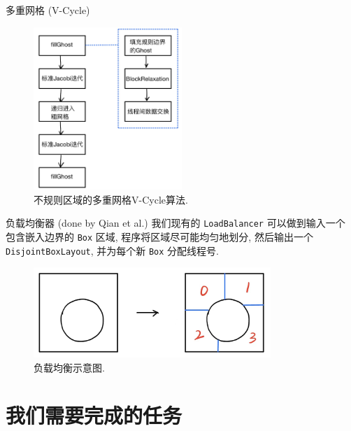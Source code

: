 \documentclass[10pt]{beamer}
\begin{document}
\begin{frame}[fragile]{多重网格 (V-Cycle)}
    \footnotesize
    \begin{figure}[H]
        \centering
        \includegraphics[width=0.5\textwidth]{jpg/v-cycle.jpeg}
        \caption{\footnotesize 不规则区域的多重网格V-Cycle算法.}
    \end{figure}
\end{frame}

\begin{frame}[fragile]{负载均衡器 (done by Qian et al.)}
    \footnotesize
    我们现有的 \verb|LoadBalancer| 可以做到输入一个
    包含嵌入边界的 \verb|Box| 区域,
    程序将区域尽可能均匀地划分,
    然后输出一个 \verb|DisjointBoxLayout|, 
    并为每个新 \verb|Box| 分配线程号.

    \begin{figure}[H]
        \centering
        \includegraphics[width=0.8\textwidth]{jpg/oldbalance.jpeg}
        \caption{\footnotesize 负载均衡示意图.}
    \end{figure}
\end{frame}

\section{我们需要完成的任务}
\end{document}
